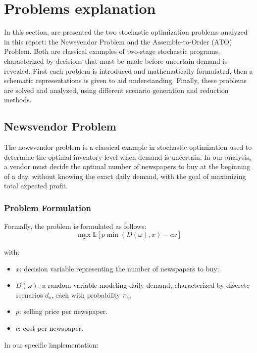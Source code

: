 \documentclass[a4paper,12pt]{article}
\begin{document}
	\newpage
	\section{Problems explanation}
	
	In this section, are presented the two stochastic optimization problems analyzed in this report: the Newsvendor Problem and the Assemble-to-Order (ATO) Problem. Both are classical examples of two-stage stochastic programs, characterized by decisions that must be made before uncertain demand is revealed. First each problem is introduced and mathematically formulated, then a schematic representations is given to aid understanding. Finally, these problems are solved and analyzed, using different scenario generation and reduction methods.
	
	\subsection{Newsvendor Problem}
	
	The newsvendor problem is a classical example in stochastic optimization used to determine the optimal inventory level when demand is uncertain. In our analysis, a vendor must decide the optimal number of newspapers to buy at the beginning of a day, without knowing the exact daily demand, with the goal of maximizing total expected profit.
	
	\subsubsection{Problem Formulation}
	
	Formally, the problem is formulated as follows:
	\[
	\max_{x} \mathbb{E}[p\min(D(\omega), x) - cx]
	\]
	
	with:
	\begin{itemize}
		\item \( x \): decision variable representing the number of newspapers to buy;
		\item \( D(\omega) \): a random variable modeling daily demand, characterized by discrete scenarios \( d_s \), each with probability \( \pi_s \);
		\item \( p \): selling price per newspaper.
		\item \( c \): cost per newspaper.
	\end{itemize}
	\vspace{0.20cm}

	In our specific implementation:
	
\end{document}
